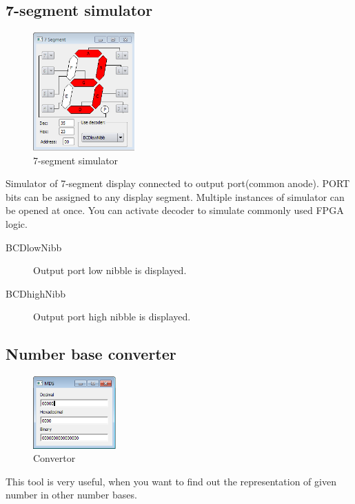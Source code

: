 \subsection{7-segment simulator}
    \begin{figure}
        \centering{}
        \includegraphics[width=110pt]{img/7seg_sim.png}
        \caption{7-segment simulator}
    \end{figure}
    Simulator of 7-segment display connected to output port(common anode). PORT bits can be assigned to any display segment. Multiple instances of simulator can be opened at once.
    You can activate decoder to simulate commonly used FPGA logic.
    \begin{description}
        \item[BCDlowNibb] Output port low nibble is displayed.
        \item[BCDhighNibb] Output port high nibble is displayed.
    \end{description}

\subsection{Number base converter}
    \begin{figure}
            \centering
            \includegraphics[width=90pt]{img/convertor.png}
            \caption{Convertor}
    \end{figure}
    This tool is very useful, when you want to find out the representation of given number in other number bases.
